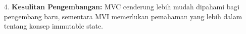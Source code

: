 \documentclass[conference]{IEEEtran}
\begin{document}
4. \textbf{Kesulitan Pengembangan:} MVC cenderung lebih mudah dipahami bagi pengembang baru, sementara MVI memerlukan pemahaman yang lebih dalam tentang konsep immutable state.




\end{document}
